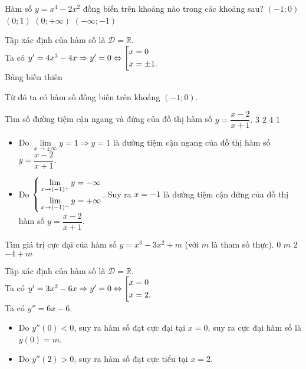 \begin{ex}%
	Hàm số $y=x^4-2x^2$ đồng biến trên khoảng nào trong các khoảng sau?
		\choice
	{\True $(-1;0)$}
	{$(0;1)$}
	{$(0;+\infty)$}
	{$(-\infty ; -1)$}
	\loigiai
	{ Tập xác định của hàm số là $\mathscr {D}=\mathbb{R}.$\\
	Ta có $y'= 4x^3-4x \Rightarrow y'=0 \Leftrightarrow \left[\begin{aligned}&x=0\\&x=\pm 1.\end{aligned}\right.$\\
	Bảng biến thiên 
	\begin{center}
	\end{center}
Từ đó ta có hàm số đồng biến trên khoảng $(-1;0)$.
	}

\end{ex}

\begin{ex}%
	Tìm số đường tiệm cận ngang và đứng của đồ thị hàm số $y=\dfrac{x-2}{x+1}.$
		\choice
	{$3$}
	{\True $2$}
	{$4$}
	{$1$}
	\loigiai
	{ \begin{itemize}
			\item Do $\lim\limits_{x \rightarrow \pm \infty}y=1 \Rightarrow y=1$ là đường tiệm cận ngang của đồ thị hàm số $y=\dfrac{x-2}{x+1}.$
			\item Do $\left\{\begin{aligned}&\lim\limits_{x\rightarrow (-1)^+}y=-\infty\\&\lim\limits_{x\rightarrow (-1)^-}y=+\infty\end{aligned}\right.$. Suy ra  $x=-1$ là đường tiệm cận đứng của đồ thị hàm số $y=\dfrac{x-2}{x+1}.$
		\end{itemize}
		
	}
\end{ex}

\begin{ex}%
	Tìm giá trị cực đại của hàm số $y=x^3-3x^2+m$ (với $m$ là tham số thực).
		\choice
	{$0$}
	{\True $m$}
	{$2$}
	{$-4+m$}
	\loigiai
	{ Tập xác định của hàm số là $\mathscr {D}=\mathbb{R}.$\\
		Ta có $y'= 3x^2-6x \Rightarrow y'=0 \Leftrightarrow \left[\begin{aligned}&x=0\\&x=2.\end{aligned}\right.$\\
		Ta có $y'' =6x-6$.
		\begin{itemize}
			\item Do $y''(0)<0$, suy ra hàm số đạt cực đại tại $x=0$, suy ra cực đại hàm số là $y(0)=m$.
			\item Do $y''(2)>0$, suy ra hàm số đạt cực tiểu tại $x=2.$
		\end{itemize}
		
	}
\end{ex}

